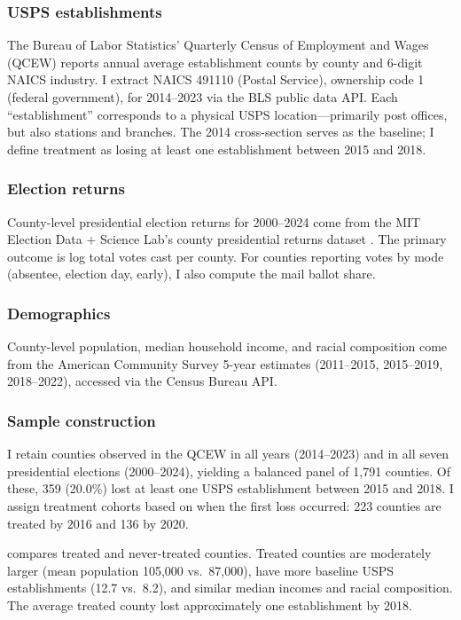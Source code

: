 \documentclass[12pt]{article}
\begin{document}
\subsubsection*{USPS establishments} The Bureau of Labor Statistics' Quarterly Census of Employment and Wages (QCEW) reports annual average establishment counts by county and 6-digit NAICS industry. I extract NAICS 491110 (Postal Service), ownership code 1 (federal government), for 2014--2023 via the BLS public data API. Each ``establishment'' corresponds to a physical USPS location---primarily post offices, but also stations and branches. The 2014 cross-section serves as the baseline; I define treatment as losing at least one establishment between 2015 and 2018.

\subsubsection*{Election returns} County-level presidential election returns for 2000--2024 come from the MIT Election Data + Science Lab's county presidential returns dataset \citep{mitelection2024}. The primary outcome is log total votes cast per county. For counties reporting votes by mode (absentee, election day, early), I also compute the mail ballot share.

\subsubsection*{Demographics} County-level population, median household income, and racial composition come from the American Community Survey 5-year estimates (2011--2015, 2015--2019, 2018--2022), accessed via the Census Bureau API.

\subsubsection*{Sample construction} I retain counties observed in the QCEW in all years (2014--2023) and in all seven presidential elections (2000--2024), yielding a balanced panel of 1,791 counties. Of these, 359 (20.0\%) lost at least one USPS establishment between 2015 and 2018. I assign treatment cohorts based on when the first loss occurred: 223 counties are treated by 2016 and 136 by 2020.



 compares treated and never-treated counties. Treated counties are moderately larger (mean population 105,000 vs.\ 87,000), have more baseline USPS establishments (12.7 vs.\ 8.2), and similar median incomes and racial composition. The average treated county lost approximately one establishment by 2018.
\end{document}
